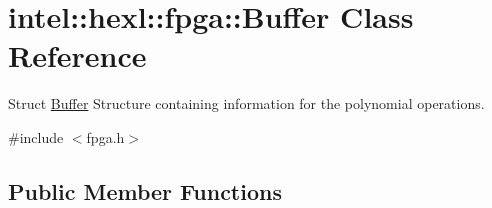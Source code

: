 \hypertarget{classintel_1_1hexl_1_1fpga_1_1Buffer}{\section{intel\-:\-:hexl\-:\-:fpga\-:\-:Buffer Class Reference}
\label{classintel_1_1hexl_1_1fpga_1_1Buffer}
}


Struct \hyperlink{classintel_1_1hexl_1_1fpga_1_1Buffer}{Buffer} Structure containing information for the polynomial operations.  




{\ttfamily \#include $<$fpga.\-h$>$}

\subsection*{Public Member Functions}
